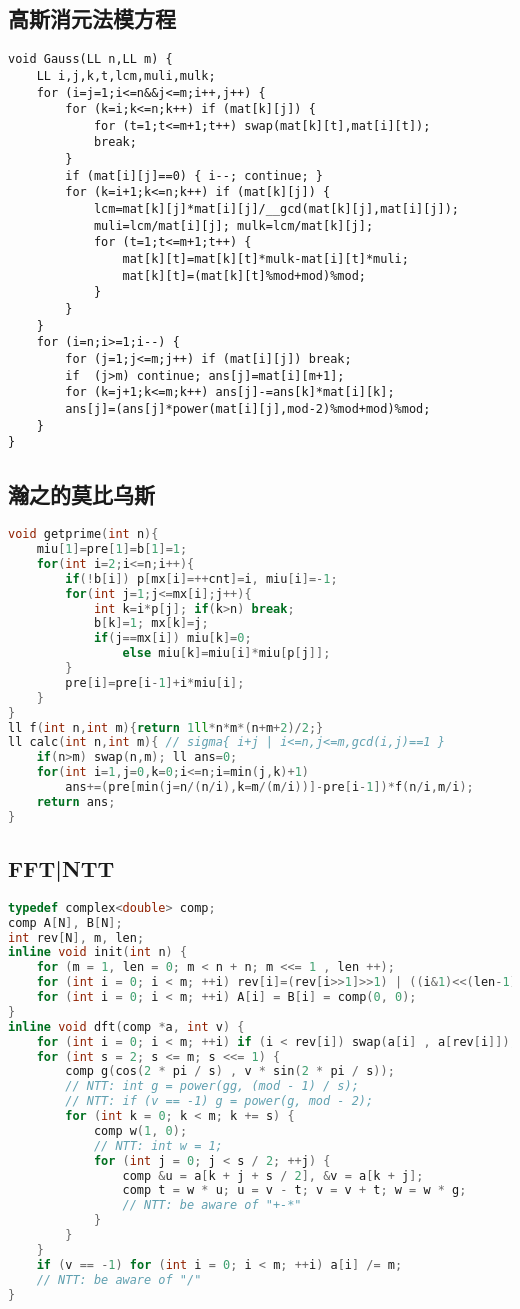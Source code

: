 \documentclass[landscape,a4paper]{article}
\begin{document}
\subsection{高斯消元法模方程}
\begin{lstlisting}
void Gauss(LL n,LL m) {
	LL i,j,k,t,lcm,muli,mulk;
	for (i=j=1;i<=n&&j<=m;i++,j++) {
		for (k=i;k<=n;k++) if (mat[k][j]) {
			for (t=1;t<=m+1;t++) swap(mat[k][t],mat[i][t]);
			break;
		}
		if (mat[i][j]==0) { i--; continue; }
		for (k=i+1;k<=n;k++) if (mat[k][j]) {
			lcm=mat[k][j]*mat[i][j]/__gcd(mat[k][j],mat[i][j]);
			muli=lcm/mat[i][j]; mulk=lcm/mat[k][j];
			for (t=1;t<=m+1;t++) {
				mat[k][t]=mat[k][t]*mulk-mat[i][t]*muli;
				mat[k][t]=(mat[k][t]%mod+mod)%mod;
			}
		}
	}
	for (i=n;i>=1;i--) {
		for (j=1;j<=m;j++) if (mat[i][j]) break;
		if  (j>m) continue; ans[j]=mat[i][m+1];
		for (k=j+1;k<=m;k++) ans[j]-=ans[k]*mat[i][k];
		ans[j]=(ans[j]*power(mat[i][j],mod-2)%mod+mod)%mod;
	}
}
\end{lstlisting}

\subsection{瀚之的莫比乌斯}
\begin{lstlisting}[language=C++]
void getprime(int n){
	miu[1]=pre[1]=b[1]=1;
	for(int i=2;i<=n;i++){
		if(!b[i]) p[mx[i]=++cnt]=i, miu[i]=-1;
		for(int j=1;j<=mx[i];j++){
			int k=i*p[j]; if(k>n) break;
			b[k]=1; mx[k]=j;
			if(j==mx[i]) miu[k]=0;
				else miu[k]=miu[i]*miu[p[j]];
		}
		pre[i]=pre[i-1]+i*miu[i];
	}
}
ll f(int n,int m){return 1ll*n*m*(n+m+2)/2;} 
ll calc(int n,int m){ // sigma{ i+j | i<=n,j<=m,gcd(i,j)==1 }
	if(n>m) swap(n,m); ll ans=0;
	for(int i=1,j=0,k=0;i<=n;i=min(j,k)+1)
		ans+=(pre[min(j=n/(n/i),k=m/(m/i))]-pre[i-1])*f(n/i,m/i);
	return ans;
}
\end{lstlisting}

\subsection{FFT|NTT}

\begin{lstlisting}[language=C++]
typedef complex<double> comp;
comp A[N], B[N];
int rev[N], m, len;
inline void init(int n) {
	for (m = 1, len = 0; m < n + n; m <<= 1 , len ++);
	for (int i = 0; i < m; ++i) rev[i]=(rev[i>>1]>>1) | ((i&1)<<(len-1));
	for (int i = 0; i < m; ++i) A[i] = B[i] = comp(0, 0);
}
inline void dft(comp *a, int v) {
	for (int i = 0; i < m; ++i) if (i < rev[i]) swap(a[i] , a[rev[i]]);
	for (int s = 2; s <= m; s <<= 1) {
		comp g(cos(2 * pi / s) , v * sin(2 * pi / s));
		// NTT: int g = power(gg, (mod - 1) / s);
		// NTT: if (v == -1) g = power(g, mod - 2);
		for (int k = 0; k < m; k += s) {
			comp w(1, 0);
			// NTT: int w = 1;
			for (int j = 0; j < s / 2; ++j) {
				comp &u = a[k + j + s / 2], &v = a[k + j];
				comp t = w * u; u = v - t; v = v + t; w = w * g;
				// NTT: be aware of "+-*"
			}
		}
	}
	if (v == -1) for (int i = 0; i < m; ++i) a[i] /= m;
	// NTT: be aware of "/"
}
\end{lstlisting}
\end{document}

